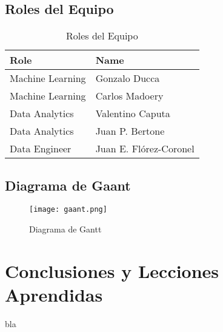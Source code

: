 \documentclass{other/docTemplate}
\begin{document}
\subsection{Roles del Equipo}
\begin{table}[H]
  \centering	
  \caption{Roles del Equipo}
  \begin{tabular}{|p{5cm}|p{10cm}|}
    \hline
    \textbf{Role} & \textbf{Name} \\\hline
    Machine Learning & Gonzalo Ducca \\\hline
    Machine Learning & Carlos Madoery \\\hline
    Data Analytics & Valentino Caputa \\\hline
    Data Analytics & Juan P. Bertone \\\hline
    Data Engineer & Juan E. Flórez-Coronel \\\hline
  \end{tabular}
  \label{tab:teamroles}
\end{table}
\subsection{Diagrama de Gaant}
\begin{figure}[htbp!]
  \texttt{[image: gaant.png]}
  \caption{Diagrama de Gantt}
  \label{fig:gaant}
\end{figure}

\clearpage
\section*{Conclusiones y Lecciones Aprendidas}

bla

  
\end{document}
